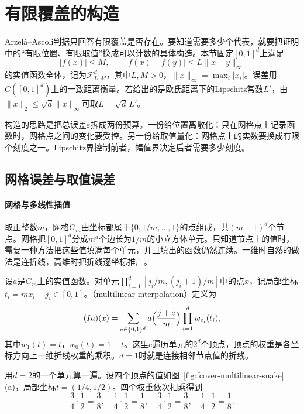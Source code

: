 \section{有限覆盖的构造}
\label{sec:fcover-construction}

Arzelà--Ascoli判据只回答有限覆盖是否存在。要知道需要多少个代表，就要把证明中的“有限位置、有限取值”换成可以计数的具体构造。本节固定$[0,1]^d$上满足
\begin{equation}
 \lvert f(x)\rvert\leq M,\qquad \lvert f(x)-f(y)\rvert\leq L\lVert x-y\rVert_\infty
 \label{eq:fcover-lipschitz-class}
\end{equation}
的实值函数全体，记为$\mathcal F^d_{L,M}$，其中$L,M>0$，$\lVert x\rVert_\infty=\max_i\lvert x_i\rvert$。误差用$C([0,1]^d)$上的一致距离衡量。若给出的是欧氏距离下的Lipschitz常数$L'$，由$\lVert x\rVert_2\leq\sqrt d\lVert x\rVert_\infty$可取$L=\sqrt d\,L'$。

构造的思路是把总误差$\varepsilon$拆成两份预算。一份给位置离散化：只在网格点上记录函数时，网格点之间的变化要受控。另一份给取值量化：网格点上的实数要换成有限个刻度之一。Lipschitz界控制前者，幅值界决定后者需要多少刻度。

\subsection{网格误差与取值误差}
\label{sec:fcover-grid-and-quantization}

\paragraph{网格与多线性插值}

取正整数$m$，网格$G_m$由坐标都属于$\{0,1/m,\ldots,1\}$的点组成，共$(m+1)^d$个节点。网格把$[0,1]^d$分成$m^d$个边长为$1/m$的小立方体单元。只知道节点上的值时，需要一种方法把这些值填满每个单元，并且填出的函数仍然连续。一维时自然的做法是连折线，高维时把折线逐坐标推广。

设$a$是$G_m$上的实值函数。对单元$\prod_{i=1}^d[j_i/m,(j_i+1)/m]$中的点$x$，记局部坐标$t_i=mx_i-j_i\in[0,1]$。（multilinear interpolation）定义为
\begin{equation}
 (Ia)(x)=\sum_{e\in\{0,1\}^d}a\Bigl(\frac{j+e}m\Bigr)\prod_{i=1}^dw_{e_i}(t_i),
 \label{eq:fcover-multilinear}
\end{equation}
其中$w_1(t)=t$，$w_0(t)=1-t$。这里$e$遍历单元的$2^d$个顶点，顶点的权重是各坐标方向上一维折线权重的乘积。$d=1$时就是连接相邻节点值的折线。

用$d=2$的一个单元算一遍。设四个顶点的值如图~\ref{fig:fcover-multilinear-snake}(a)，局部坐标$t=(1/4,1/2)$。四个权重依次相乘得到
\[
 \frac34\cdot\frac12=\frac38,\quad
 \frac14\cdot\frac12=\frac18,\quad
 \frac34\cdot\frac12=\frac38,\quad
 \frac14\cdot\frac12=\frac18 .
\]

